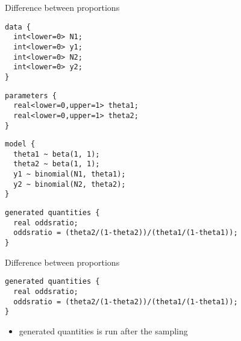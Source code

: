\documentclass[finnish,english,t]{beamer}
\begin{document}
\begin{frame}[fragile]{Difference between proportions}

  
  \vspace{-0.5\baselineskip}
  {\small
    {
\begin{verbatim}
data {
  int<lower=0> N1;
  int<lower=0> y1;
  int<lower=0> N2;
  int<lower=0> y2;
}
\end{verbatim}
    }
    \vspace{-1.5\baselineskip}
    {
\begin{verbatim}
parameters {
  real<lower=0,upper=1> theta1;
  real<lower=0,upper=1> theta2;
}
\end{verbatim}
    }
    \vspace{-1.5\baselineskip}
    {
\begin{verbatim}
model {
  theta1 ~ beta(1, 1);
  theta2 ~ beta(1, 1);
  y1 ~ binomial(N1, theta1);
  y2 ~ binomial(N2, theta2);
}
\end{verbatim}
    }
    \vspace{-1.5\baselineskip}
    {
\begin{verbatim}
generated quantities {
  real oddsratio;
  oddsratio = (theta2/(1-theta2))/(theta1/(1-theta1));
}
\end{verbatim}
    }
  }
\end{frame}

\begin{frame}[fragile]{Difference between proportions}

  
  {\small
\begin{verbatim}
generated quantities {
  real oddsratio;
  oddsratio = (theta2/(1-theta2))/(theta1/(1-theta1));
}
\end{verbatim}
    }

    \begin{itemize}
    \item generated quantities is run after the sampling
    \end{itemize}
    
\end{frame}
\end{document}
